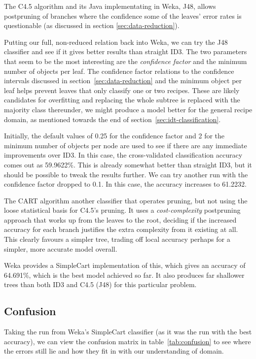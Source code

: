 \documentclass[11pt,a4paper]{article}
\begin{document}
The C4.5 algorithm and its Java implementating in Weka, J48, allows postpruning
of branches where the confidence some of the leaves' error rates is questionable
(as discussed in section \ref{sec:data-reduction}).

Putting our full, non-reduced relation back into Weka, we can try the J48
classifier and see if it gives better results than straight ID3. The two parameters
that seem to be the most interesting are the \emph{confidence factor} and the
minimum number of objects per leaf. The confidence factor relations to the
confidence intervals discussed in section~\ref{sec:data-reduction} and
the minimum object per leaf helps prevent leaves that only classify one or two
recipes. These are likely candidates for overfitting and replacing the whole
subtree is replaced with the majority class thereunder, we might produce a model
better for the general recipe domain, as mentioned towards the end of
section~\ref{sec:idt-classification}.

Initially, the default values of 0.25 for the confidence factor and 2 for the minimum
number of objects per node are used to see if there are any immediate improvements
over ID3. In this case, the cross-validated classification accuracy comes out
as 59.9622\%. This is already somewhat better than straight ID3, but it should be possible to
tweak the results further. We can try another run with the confidence factor dropped
to 0.1. In this case, the accuracy increases to 61.2232.

The CART algorithm another classifier that operates pruning, but not using
the loose statistical basis for C4.5's pruning. It uses a \emph{cost-complexity}
postpruning approach that works up from the leaves to the root, deciding if
the increased accuracy for each branch justifies the extra complexity from it
existing at all. This clearly favours a simpler tree, trading off local accuracy
perhaps for a simpler, more accurate model overall.

Weka provides a SimpleCart
implementation of this, which gives an accuracy of 64.691\%, which is the best
model achieved so far. It also produces far shallower trees than both ID3
and C4.5 (J48) for this particular problem.

\subsection{Confusion}

Taking the run from Weka's SimpleCart classifier (as it was the run with the 
best accuracy), we can view the confusion matrix in table~\ref{tab:confusion}
to see where the errors still lie and how they fit in with our understanding of domain.
\end{document}
